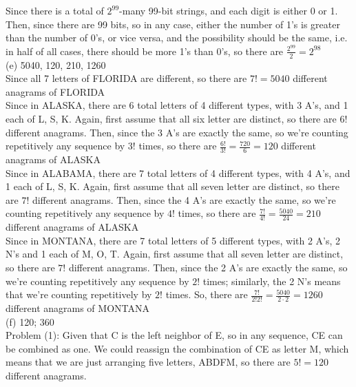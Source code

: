 \documentclass{article}
\begin{document}
Since there is a total of $2^{99}$-many 99-bit strings, and each digit is either 0 or 1. Then, since there are 99 bits, so in any case, either the number of 1's is greater than the number of 0's, or vice versa, and the possibility should be the same, i.e. in half of all cases, there should be more 1's than 0's, so there are $\frac{2^{99}}{2} = 2^{98}$ \\[.5cm]
{\color{red} (e) 5040, 120, 210, 1260} \\

Since all 7 letters of FLORIDA are different, so there are $7! = 5040$ different anagrams of FLORIDA \\

Since in ALASKA, there are 6 total letters of 4 different types, with 3 A's, and 1 each of L, S, K. Again, first assume that all six letter are distinct, so there are $6!$ different anagrams. Then, since the 3 A's are exactly the same, so we're counting repetitively any sequence by $3!$ times, so there are $\frac{6!}{3!} = \frac{720}{6} = 120$ different anagrams of ALASKA \\

Since in ALABAMA, there are 7 total letters of 4 different types, with 4 A's, and 1 each of L, S, K. Again, first assume that all seven letter are distinct, so there are $7!$ different anagrams. Then, since the 4 A's are exactly the same, so we're counting repetitively any sequence by $4!$ times, so there are $\frac{7!}{4!} = \frac{5040}{24} = 210$ different anagrams of ALASKA \\

Since in MONTANA, there are 7 total letters of 5 different types, with 2 A's, 2 N's and 1 each of M, O, T. Again, first assume that all seven letter are distinct, so there are $7!$ different anagrams. Then, since the 2 A's are exactly the same, so we're counting repetitively any sequence by $2!$ times; similarly, the 2 N's means that we're counting repetitively by $2!$ times. So, there are $\frac{7!}{2!2!} = \frac{5040}{2\cdot2} = 1260$ different anagrams of MONTANA \\[.5cm]
{\color{red} (f) 120; 360} \\

Problem (1): Given that C is the left neighbor of E, so in any sequence, CE can be combined as one. We could reassign the combination of CE as letter M, which means that we are just arranging five letters, ABDFM, so there are $5! = 120$ different anagrams. \\
\end{document}
